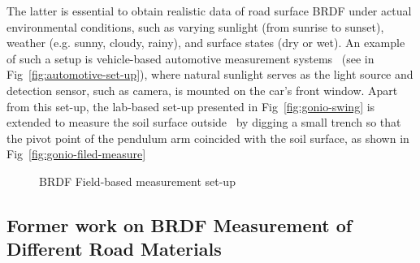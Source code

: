 The latter is essential to obtain realistic data of road surface BRDF under actual environmental conditions, such as varying sunlight (from sunrise to sunset), weather (e.g. sunny, cloudy, rainy), and surface states (dry or wet).
An example of such a setup is vehicle-based automotive measurement systems~\cite{2010_Roser} (see in Fig~\ref{fig:automotive-set-up}), where natural sunlight serves as the light source and detection sensor, such as camera, is mounted on the car's front window.
Apart from this set-up, the lab-based set-up presented in Fig~\ref{fig:gonio-swing} is extended to measure the soil surface outside~\cite{2022_Wise} by digging a small trench so that the pivot point of the pendulum arm coincided with the soil surface, as shown in Fig~\ref{fig:gonio-filed-measure}

\begin{figure}[!tb]
    \centering
    \hfil
    \caption{BRDF Field-based measurement set-up}
    \label{fig:field-based-measure}
\end{figure}



\subsection{Former work on BRDF Measurement of Different Road Materials}

